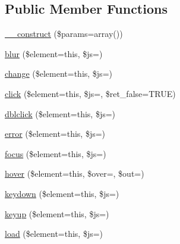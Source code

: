 \subsection*{Public Member Functions}
\begin{DoxyCompactItemize}
\item 
\mbox{\hyperlink{class_c_i___javascript_a7e5e24c19109d6c54be7fe79accffbc3}{\+\_\+\+\_\+construct}} (\$params=array())
\item 
\mbox{\hyperlink{class_c_i___javascript_abcfcaabe983424acfbaa51f52ed9ab44}{blur}} (\$element=\textquotesingle{}this\textquotesingle{}, \$js=\textquotesingle{}\textquotesingle{})
\item 
\mbox{\hyperlink{class_c_i___javascript_aa0dd12f8488bc456487328b42bb2eb85}{change}} (\$element=\textquotesingle{}this\textquotesingle{}, \$js=\textquotesingle{}\textquotesingle{})
\item 
\mbox{\hyperlink{class_c_i___javascript_a1c64e314e075cecfc48101e4b0b00ef7}{click}} (\$element=\textquotesingle{}this\textquotesingle{}, \$js=\textquotesingle{}\textquotesingle{}, \$ret\+\_\+false=T\+R\+UE)
\item 
\mbox{\hyperlink{class_c_i___javascript_a064c69c09983b73858486ac7227c93ec}{dblclick}} (\$element=\textquotesingle{}this\textquotesingle{}, \$js=\textquotesingle{}\textquotesingle{})
\item 
\mbox{\hyperlink{class_c_i___javascript_a3355b4409dc6e3f014c458360800ba16}{error}} (\$element=\textquotesingle{}this\textquotesingle{}, \$js=\textquotesingle{}\textquotesingle{})
\item 
\mbox{\hyperlink{class_c_i___javascript_aa50dc46540eec5b088b60fc738080db9}{focus}} (\$element=\textquotesingle{}this\textquotesingle{}, \$js=\textquotesingle{}\textquotesingle{})
\item 
\mbox{\hyperlink{class_c_i___javascript_af109665fb707723bbb00f797b855a30e}{hover}} (\$element=\textquotesingle{}this\textquotesingle{}, \$over=\textquotesingle{}\textquotesingle{}, \$out=\textquotesingle{}\textquotesingle{})
\item 
\mbox{\hyperlink{class_c_i___javascript_a6ae7fcdb40c0f5fa662f54c76d2d3e2f}{keydown}} (\$element=\textquotesingle{}this\textquotesingle{}, \$js=\textquotesingle{}\textquotesingle{})
\item 
\mbox{\hyperlink{class_c_i___javascript_af7e3a613fce6fd87fe0b2cbc5a4049d0}{keyup}} (\$element=\textquotesingle{}this\textquotesingle{}, \$js=\textquotesingle{}\textquotesingle{})
\item 
\mbox{\hyperlink{class_c_i___javascript_ac4ae2cbab904d31d29d95e002c2999e2}{load}} (\$element=\textquotesingle{}this\textquotesingle{}, \$js=\textquotesingle{}\textquotesingle{})

\end{DoxyCompactItemize}
